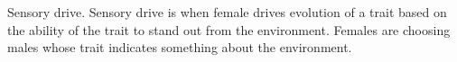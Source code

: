 \documentclass[12pt, addpoints]{exam}
\newcommand*\AnswerBox[2]{%
    \parbox[t][#1]{0.92\linewidth}{%
    \begin{solution}#2\end{solution}}
    \vspace*{\stretch{1}}
}
\newlength{\basespace}
\begin{document}
\begin{questions}
\begin{parts}
	\AnswerBox{0.3\textheight}{%
		Sensory drive. Sensory drive is when female drives evolution of a trait based on the ability of the trait to stand out from the environment. Females are choosing males whose trait indicates something about the environment.
	}
\end{parts}


%
%
%
%
%
%
%
%



%


\newpage



\end{questions}
\end{document}
